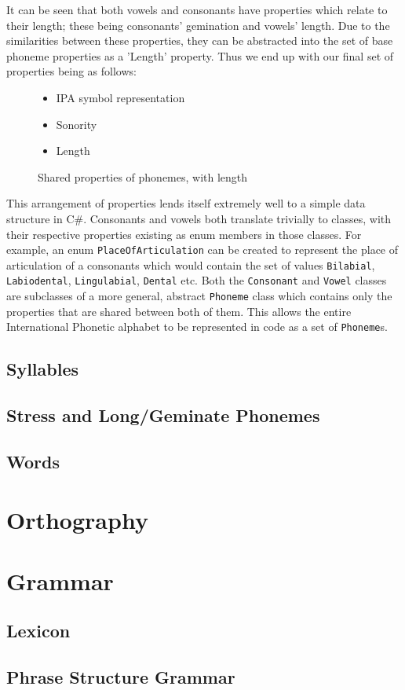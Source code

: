 \documentclass{report}
\newcommand{\Csh}{C{\lserif\#}}
\begin{document}
	It can be seen that both vowels and consonants have properties which relate to their length; these being consonants' gemination and vowels' length. Due to the similarities between these properties, they can be abstracted into the set of base phoneme properties as a 'Length' property. Thus we end up with our final set of properties being as follows:

	\begin{figure}[h]
	\caption{Shared properties of phonemes, with length}
	\label{shared properties of phonemes with length}
	\begin{tcolorbox}
		\begin{itemize}
			\item IPA symbol representation
			\item Sonority
			\item Length
		\end{itemize}
	\end{tcolorbox}
	\end{figure}

	This arrangement of properties lends itself extremely well to a simple data structure in \Csh{}. Consonants and vowels both translate trivially to classes, with their respective properties existing as enum members in those classes. For example, an enum \texttt{PlaceOfArticulation} can be created to represent the place of articulation of a consonants which would contain the set of values \texttt{Bilabial}, \texttt{Labiodental}, \texttt{Lingulabial}, \texttt{Dental} etc. Both the \texttt{Consonant} and \texttt{Vowel} classes are subclasses of a more general, abstract \texttt{Phoneme} class which contains only the properties that are shared between both of them. This allows the entire International Phonetic alphabet to be represented in code as a set of \texttt{Phoneme}s.

	\section{Syllables}
	
	\section{Stress and Long/Geminate Phonemes}
	
	\section{Words}
	
	\chapter{Orthography}
	
	\chapter{Grammar}
	
	\section{Lexicon}
	
	\section{Phrase Structure Grammar}
   
   \printbibliography
\end{document}

